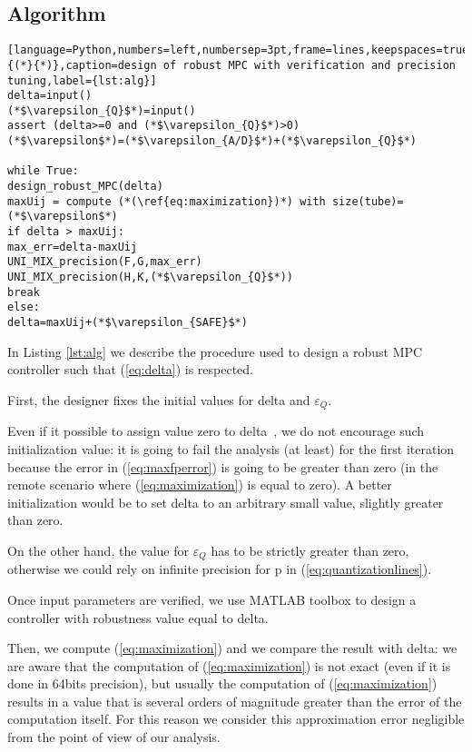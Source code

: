\subsection{Algorithm}

\begin{lstlisting}[language=Python,numbers=left,numbersep=3pt,frame=lines,keepspaces=true,escapeinside={(*}{*)},caption=design of robust MPC with verification and precision tuning,label={lst:alg}]
delta=input()
(*$\varepsilon_{Q}$*)=input()
assert (delta>=0 and (*$\varepsilon_{Q}$*)>0)
(*$\varepsilon$*)=(*$\varepsilon_{A/D}$*)+(*$\varepsilon_{Q}$*)

while True:
design_robust_MPC(delta)
maxUij = compute (*(\ref{eq:maximization})*) with size(tube)=(*$\varepsilon$*)
if delta > maxUij:
max_err=delta-maxUij
UNI_MIX_precision(F,G,max_err)
UNI_MIX_precision(H,K,(*$\varepsilon_{Q}$*))
break
else:
delta=maxUij+(*$\varepsilon_{SAFE}$*)
\end{lstlisting}
In Listing \ref{lst:alg} we describe the procedure used to design a robust MPC controller such that (\ref{eq:delta}) is respected.

First, the designer fixes the initial values for delta and $\varepsilon_{Q}$.

Even if it possible to assign value zero to delta~\cite{imperialrmpc}, we do not encourage such initialization value: it is going to fail the analysis (at least) for the first iteration because the error in (\ref{eq:maxfperror}) is going to be greater than zero (in the remote scenario where  (\ref{eq:maximization}) is equal to zero). A better initialization would be to set delta to an arbitrary small value, slightly greater than zero.

On the other hand, the value for $\varepsilon_{Q}$ has to be strictly greater than zero, otherwise we could rely on infinite precision for p in (\ref{eq:quantizationlines}).

Once input parameters are verified, we use MATLAB toolbox to design a controller with robustness value equal to delta. 

Then, we compute (\ref{eq:maximization}) and we compare the result with delta: we are aware that the computation of (\ref{eq:maximization}) is not exact (even if it is done in 64bits precision), but usually the computation of (\ref{eq:maximization}) results in a value that is several orders of magnitude greater than the error of the computation itself. For this reason we consider this approximation error negligible from the point of view of our analysis. 

